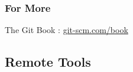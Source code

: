 \documentclass{beamer}
\begin{document}



















\begin{frame}[fragile]
\frametitle{For More}
The Git Book : \href{https://git-scm.com/book}{git-scm.com/book}
\end{frame}

\subsection{Remote Tools}
\end{document}
